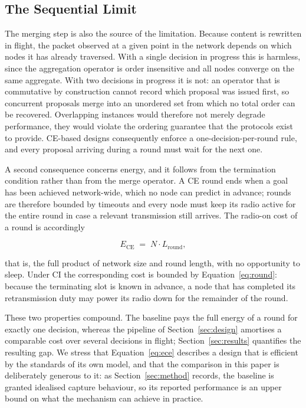 \documentclass[journal]{IEEEtran}
\newcommand{\CI}{CI}                      %
\newcommand{\CE}{CE}                      %
\newcommand{\Nnodes}{N}                   %
\newcommand{\Lround}{L_{\mathrm{round}}}  %
\newcommand{\Ece}{E_{\mathrm{CE}}}        %
\begin{document}
\subsection{The Sequential Limit}
\label{sec:baseline-sequential}

The merging step is also the source of the limitation. Because content is
rewritten in flight, the packet observed at a given point in the network
depends on which nodes it has already traversed. With a single decision in
progress this is harmless, since the aggregation operator is order
insensitive and all nodes converge on the same aggregate. With two
decisions in progress it is not: an operator that is commutative by
construction cannot record which proposal was issued first, so concurrent
proposals merge into an unordered set from which no total order can be
recovered. Overlapping instances would therefore not merely degrade
performance, they would violate the ordering guarantee that the protocols
exist to provide. \CE-based designs consequently enforce a
one-decision-per-round rule, and every proposal arriving during a round
must wait for the next one.

A second consequence concerns energy, and it follows from the termination
condition rather than from the merge operator. A \CE{} round ends when a
goal has been achieved network-wide, which no node can predict in advance;
rounds are therefore bounded by timeouts and every node must keep its
radio active for the entire round in case a relevant transmission still
arrives. The radio-on cost of a round is accordingly

\begin{equation}
\label{eq:ece}
\Ece \;=\; \Nnodes \cdot \Lround ,
\end{equation}

that is, the full product of network size and round length, with no
opportunity to sleep. Under \CI{} the corresponding cost is bounded by
Equation~\eqref{eq:round}: because the terminating slot is known in
advance, a node that has completed its retransmission duty may power its
radio down for the remainder of the round.

These two properties compound. The baseline pays the full energy of a
round for exactly one decision, whereas the pipeline of
Section~\ref{sec:design} amortises a comparable cost over several
decisions in flight; Section~\ref{sec:results} quantifies the resulting
gap. We stress that Equation~\eqref{eq:ece} describes a design that is
efficient by the standards of its own model, and that the comparison in
this paper is deliberately generous to it: as Section~\ref{sec:method}
records, the baseline is granted idealised capture behaviour, so its
reported performance is an upper bound on what the mechanism can achieve
in practice.
\end{document}
